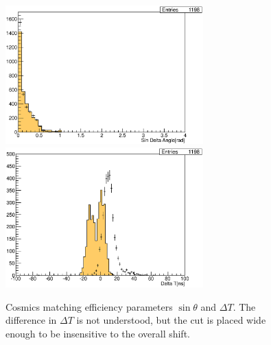 \begin{figure}[h]
\centering
\includegraphics[width=3in]{Figures/Systematics/MatchingEfficiency/dScosmics.eps}
\includegraphics[width=3in]{Figures/Systematics/MatchingEfficiency/dTcosmics.eps}
\caption{Cosmics matching efficiency parameters \(\sin \theta\) and \(\Delta T\). The difference in \(\Delta T\) is not understood, but the cut is placed wide enough to be insensitive to the overall shift.}
\label{fig:eff_dSdT}
\end{figure}

